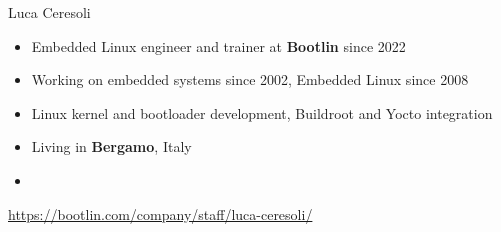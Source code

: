 \begin{frame}{Luca Ceresoli}
    \begin{itemize}
        \item Embedded Linux engineer and trainer at {\bf Bootlin}
          since 2022
        \item Working on embedded systems since 2002, Embedded Linux
          since 2008
        \item Linux kernel and bootloader development, Buildroot and
          Yocto integration
        \item Living in {\bf Bergamo}, Italy
        \item {}
    \end{itemize}
    {\small \url{https://bootlin.com/company/staff/luca-ceresoli/}}
\end{frame}
